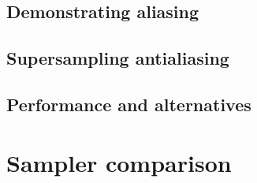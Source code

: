 \documentclass{article}
\begin{document}
\subsection{Demonstrating aliasing}

\subsection{Supersampling antialiasing}

\subsection{Performance and alternatives}

\section{Sampler comparison}

\end{document}
